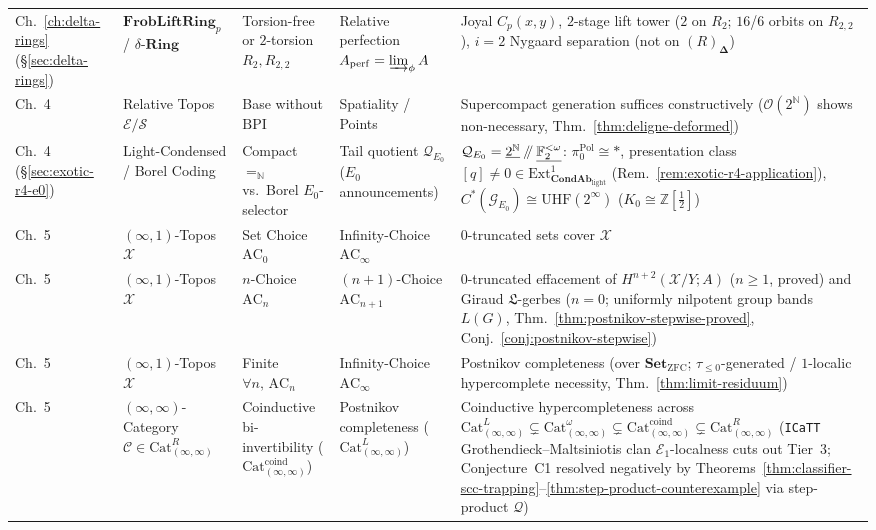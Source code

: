 \documentclass[10pt,twoside,openright]{book}
\theoremstyle{crmplain}
\theoremstyle{crmdef}
\theoremstyle{crmremark}
\newcommand{\Prism}{\mathbf{\Delta}}
\providecommand{\sslash}{\mathbin{/\mkern-5mu/}}
\begin{document}
{\begin{xltabular}{\textwidth}{@{}P{0.11\textwidth}P{0.17\textwidth}P{0.18\textwidth}P{0.18\textwidth}Y@{}}
Ch.~\ref{ch:delta-rings} (\S\ref{sec:delta-rings}) & $\mathbf{FrobLiftRing}_p$ / $\delta$-$\mathbf{Ring}$ & Torsion-free or $2$-torsion $R_2, R_{2,2}$ & Relative perfection $A_{\mathrm{perf}} = \varinjlim_\phi A$ & Joyal $C_p(x,y)$, $2$-stage lift tower ($2$ on $R_2$; $16$/$6$ orbits on $R_{2,2}$), $i=2$ Nygaard separation (not on $(R)_{\Prism}$) \\
Ch.~4 & Relative Topos $\mathcal{E}/\mathcal{S}$ & Base without $\mathrm{BPI}$ & Spatiality / Points & Supercompact generation suffices constructively ($\mathcal{O}(2^{\mathbb{N}})$ shows non-necessary, Thm.~\ref{thm:deligne-deformed}) \\
Ch.~4 (\S\ref{sec:exotic-r4-e0}) & Light-Condensed / Borel Coding & Compact $=_{\mathbb{N}}$ vs.\ Borel $E_0$-selector & Tail quotient $\mathcal{Q}_{E_0}$ ($E_0$ announcements) & $\mathcal{Q}_{E_0} = \underline{2^{\mathbb{N}}}\sslash\underline{\mathbb{F}_2^{<\omega}}$: $\pi_0^{\mathrm{Pol}} \cong *$, presentation class $[q] \neq 0 \in \mathrm{Ext}^1_{\mathbf{CondAb}_{\mathrm{light}}}$ (Rem.~\ref{rem:exotic-r4-application}), $C^*(\mathcal{G}_{E_0}) \cong \mathrm{UHF}(2^\infty)$ ($K_0 \cong \mathbb{Z}[\tfrac{1}{2}]$) \\
Ch.~5 & $(\infty, 1)$-Topos $\mathcal{X}$ & Set Choice $\mathrm{AC}_0$ & Infinity-Choice $\mathrm{AC}_\infty$ & $0$-truncated sets cover $\mathcal{X}$ \\
Ch.~5 & $(\infty, 1)$-Topos $\mathcal{X}$ & $n$-Choice $\mathrm{AC}_n$ & $(n+1)$-Choice $\mathrm{AC}_{n+1}$ & $0$-truncated effacement of $H^{n+2}(\mathcal{X}/Y; A)$ ($n \ge 1$, proved) and Giraud $\mathfrak{L}$-gerbes ($n = 0$; uniformly nilpotent group bands $L(G)$, Thm.~\ref{thm:postnikov-stepwise-proved}, Conj.~\ref{conj:postnikov-stepwise}) \\
Ch.~5 & $(\infty, 1)$-Topos $\mathcal{X}$ & Finite $\forall n,\, \mathrm{AC}_n$ & Infinity-Choice $\mathrm{AC}_\infty$ & Postnikov completeness (over $\mathbf{Set}_{\mathrm{ZFC}}$; $\tau_{\le 0}$-generated / $1$-localic hypercomplete necessity, Thm.~\ref{thm:limit-residuum}) \\
Ch.~5 & $(\infty, \infty)$-Category $\mathcal{C} \in \mathrm{Cat}^R_{(\infty, \infty)}$ & Coinductive bi-invertibility ($\mathrm{Cat}^{\mathrm{coind}}_{(\infty, \infty)}$) & Postnikov completeness ($\mathrm{Cat}^L_{(\infty, \infty)}$) & Coinductive hypercompleteness across $\mathrm{Cat}^L_{(\infty, \infty)} \subsetneq \mathrm{Cat}^\omega_{(\infty, \infty)} \subsetneq \mathrm{Cat}^{\mathrm{coind}}_{(\infty, \infty)} \subsetneq \mathrm{Cat}^R_{(\infty, \infty)}$ (\texttt{ICaTT} Grothendieck--Maltsiniotis clan $\mathcal{E}_1$-localness cuts out Tier~3; Conjecture~C1 resolved negatively by Theorems~\ref{thm:classifier-scc-trapping}--\ref{thm:step-product-counterexample} via step-product $\mathcal{Q}$) \\

\end{xltabular}}
\end{document}
